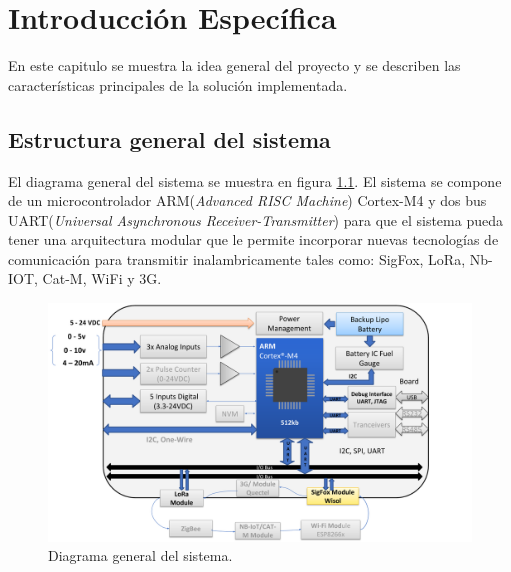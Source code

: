 \chapter{Introducción Específica} %

\label{Chapter2}

En este capitulo se muestra la idea general del proyecto y se describen las características principales de la solución implementada.
\section{Estructura general del sistema}


El diagrama general del sistema se muestra en figura \ref{fig:esquemaGeneral}. El sistema se compone de un microcontrolador ARM(\textit{Advanced RISC Machine}) Cortex\textregistered -M4 y dos bus UART(\textit{Universal Asynchronous Receiver-Transmitter}) para que el sistema pueda tener una arquitectura modular que le permite incorporar nuevas tecnologías de comunicación para transmitir inalambricamente tales como: SigFox, LoRa, Nb-IOT, Cat-M, WiFi y 3G.


\begin{figure}[h]

	\centering

	\includegraphics[scale=.35]{./Figures/esquemaGeneral.png}

	\caption{Diagrama general del sistema.}

	\label{fig:esquemaGeneral}

\end{figure}



